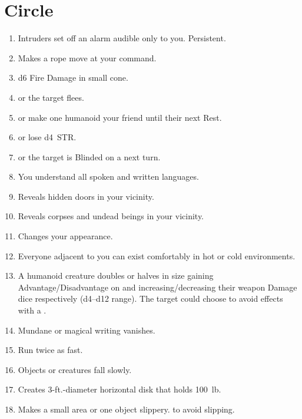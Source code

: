 \documentclass[itdr]{subfiles}
\begin{document}

\vfill
\break

\section{ Circle}
\begin{enumerate}
	\item {} Intruders set off an alarm audible only to you. Persistent.
	\item {} Makes a rope move at your command.
	\item {} d6 Fire Damage in small cone.
	\item {}  or the target flees.
	\item {}  or make one humanoid your friend until their next Rest.
	\item {}  or lose d4~STR.
	\item {}  or the target is Blinded on a next turn.
	\item {} You understand all spoken and written languages.
	\item {} Reveals hidden doors in your vicinity.
	\item {} Reveals corpses and undead beings in your vicinity.
	\item {} Changes your appearance.
	\item {} Everyone adjacent to you can exist comfortably in hot or cold environments.
	\item {} A humanoid creature doubles or halves in size gaining Advantage/Disadvantage on  and increasing/decreasing their weapon Damage dice respectively (d4--d12 range). The target could choose to avoid effects with a .
	\item {} Mundane or magical writing vanishes.
	\item {} Run twice as fast.
	\item {} Objects or creatures fall slowly.
	\item {} Creates 3-ft.-diameter horizontal disk that holds 100~lb.
	\item {} Makes a small area or one object slippery.  to avoid slipping.

\end{enumerate}
\end{document}
